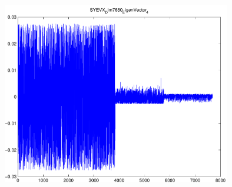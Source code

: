 \documentclass[9pt]{article}
\theoremstyle{plain}
\theoremstyle{definition}
\theoremstyle{remark}
\numberwithin{equation}{section}
\begin{document}
\includegraphics[width=10.0cm,height=10.0cm]{SYEVX_Dim7680_EigenVector_4.pdf}
\end{document}
